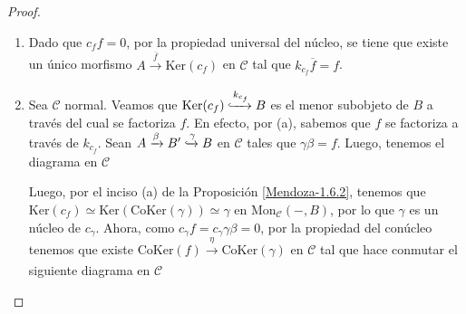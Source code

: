 \documentclass[tesis]{subfiles}
\begin{document}
\begin{proof}\leavevmode

    \begin{enumerate}[label=(\alph*)]
    
        \item Dado que $c_f f=0$, por la propiedad universal del núcleo, se tiene que existe un único morfismo $A\xrightarrow[]{\overline{f}} \text{Ker}(c_f)$ en $\mathscr{C}$ tal que $k_{c_f}\overline{f} = f$.

        \item Sea $\mathscr{C}$ normal. Veamos que $\text{Ker}(c_f)\xhookrightarrow{k_{c_f}} B$ es el menor subobjeto de $B$ a través del cual se factoriza $f$. En efecto, por (a), sabemos que $f$ se factoriza a través de $k_{c_f}$. Sean $A\xrightarrow[]{\beta}B'\xhookrightarrow{\gamma}B$ en $\mathscr{C}$ tales que $\gamma\beta = f$. Luego, tenemos el diagrama en $\mathscr{C}$
        \begin{center}
        \end{center}
        Luego, por el inciso (a) de la Proposición \ref{Mendoza-1.6.2}, tenemos que $\text{Ker}(c_f) \simeq \text{Ker}(\text{CoKer}(\gamma)) \simeq \gamma$ en $\text{Mon}_\mathscr{C}(-,B)$, por lo que $\gamma$ es un núcleo de $c_\gamma$. Ahora, como $c_\gamma f = c_\gamma\gamma\beta = 0$, por la propiedad del conúcleo tenemos que existe $\text{CoKer}(f)\xrightarrow[]{\eta}\text{CoKer}(\gamma)$ en $\mathscr{C}$ tal que hace conmutar el siguiente diagrama en $\mathscr{C}$
        \begin{center}

\end{center}
\end{enumerate}
\end{proof}
\end{document}
